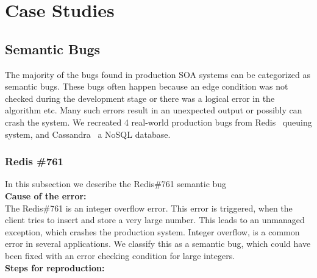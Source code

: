 \section{Case Studies}
\label{sec:parikshanCasestudy}




\subsection{Semantic Bugs}
The majority of the bugs found in production SOA systems can be categorized as semantic bugs.
These bugs often happen because an edge condition was not checked during the development stage or there was a logical error in the algorithm etc.
Many such errors result in an unexpected output or possibly can crash the system.
We recreated 4 real-world production bugs from Redis~\cite{redis} queuing system, and Cassandra~\cite{cassandra} a NoSQL database.


\subsubsection{Redis \#761}

In this subsection we describe the Redis\#761 semantic bug \\

\noindent \textbf{Cause of the error:}\\


\noindent The Redis\#761 is an integer overflow error. 
This error is triggered, when the client tries to insert and store a very large number. 
This leads to an unmanaged exception, which crashes the production system. 
Integer overflow, is a common error in several applications. 
We classify this as a semantic bug, which could have been fixed with an error checking condition for large integers. \\


\noindent \textbf{Steps for reproduction:}\\

